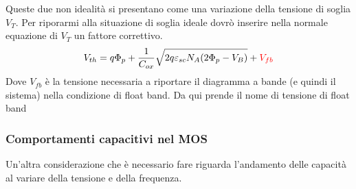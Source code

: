 Queste due non idealità si presentano come una variazione della tensione di soglia $V_T$. Per riporarmi alla situazione di soglia ideale dovrò inserire nella normale equazione di $V_T$ un fattore correttivo.
\begin{equation}
    V_{th}=q\Phi_p+\dfrac{1}{C_{ox}}\sqrt{2q\varepsilon_{sc}N_A(2\Phi_p -V_B)}+ \textcolor{red}{V_{fb}}
\end{equation}
Dove $V_{fb}$ è la tensione necessaria a riportare il diagramma a bande (e quindi il sistema) nella condizione di float band. Da qui prende il nome di tensione di float band
\cleardoublepage
%
\subsubsection{Comportamenti capacitivi nel MOS}
%
Un'altra considerazione che è necessario fare riguarda l'andamento delle capacità al variare della tensione e della frequenza.
%
